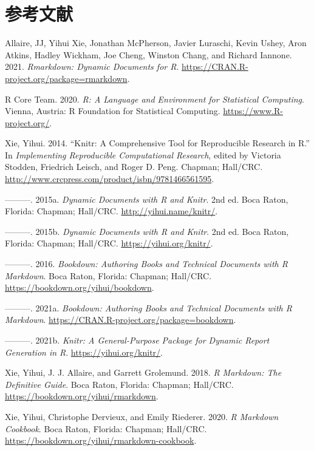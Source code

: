 \documentclass[
  lang=cn,
  11pt,
  scheme=chinese,
  chinesefont=nofont,
  citestyle=gb7714-2015,
  bibstyle=gb7714-2015]{elegantbook}
\newlength{\cslhangindent}
\newenvironment{cslreferences}%
  {\setlength{\parindent}{0pt}%
  \everypar{\setlength{\hangindent}{\cslhangindent}}\ignorespaces}%
  {\par}
\begin{document}
\hypertarget{References}{%
\chapter*{参考文献}\label{References}}

\hypertarget{refs}{}
\begin{cslreferences}
\leavevmode\hypertarget{ref-R-rmarkdown}{}%
Allaire, JJ, Yihui Xie, Jonathan McPherson, Javier Luraschi, Kevin Ushey, Aron Atkins, Hadley Wickham, Joe Cheng, Winston Chang, and Richard Iannone. 2021. \emph{Rmarkdown: Dynamic Documents for R}. \url{https://CRAN.R-project.org/package=rmarkdown}.

\leavevmode\hypertarget{ref-R-base}{}%
R Core Team. 2020. \emph{R: A Language and Environment for Statistical Computing}. Vienna, Austria: R Foundation for Statistical Computing. \url{https://www.R-project.org/}.

\leavevmode\hypertarget{ref-knitr2014}{}%
Xie, Yihui. 2014. ``Knitr: A Comprehensive Tool for Reproducible Research in R.'' In \emph{Implementing Reproducible Computational Research}, edited by Victoria Stodden, Friedrich Leisch, and Roger D. Peng. Chapman; Hall/CRC. \url{http://www.crcpress.com/product/isbn/9781466561595}.

\leavevmode\hypertarget{ref-xie2015}{}%
---------. 2015a. \emph{Dynamic Documents with R and Knitr}. 2nd ed. Boca Raton, Florida: Chapman; Hall/CRC. \url{http://yihui.name/knitr/}.

\leavevmode\hypertarget{ref-knitr2015}{}%
---------. 2015b. \emph{Dynamic Documents with R and Knitr}. 2nd ed. Boca Raton, Florida: Chapman; Hall/CRC. \url{https://yihui.org/knitr/}.

\leavevmode\hypertarget{ref-bookdown2016}{}%
---------. 2016. \emph{Bookdown: Authoring Books and Technical Documents with R Markdown}. Boca Raton, Florida: Chapman; Hall/CRC. \url{https://bookdown.org/yihui/bookdown}.

\leavevmode\hypertarget{ref-R-bookdown}{}%
---------. 2021a. \emph{Bookdown: Authoring Books and Technical Documents with R Markdown}. \url{https://CRAN.R-project.org/package=bookdown}.

\leavevmode\hypertarget{ref-R-knitr}{}%
---------. 2021b. \emph{Knitr: A General-Purpose Package for Dynamic Report Generation in R}. \url{https://yihui.org/knitr/}.

\leavevmode\hypertarget{ref-rmarkdown2018}{}%
Xie, Yihui, J. J. Allaire, and Garrett Grolemund. 2018. \emph{R Markdown: The Definitive Guide}. Boca Raton, Florida: Chapman; Hall/CRC. \url{https://bookdown.org/yihui/rmarkdown}.

\leavevmode\hypertarget{ref-rmarkdown2020}{}%
Xie, Yihui, Christophe Dervieux, and Emily Riederer. 2020. \emph{R Markdown Cookbook}. Boca Raton, Florida: Chapman; Hall/CRC. \url{https://bookdown.org/yihui/rmarkdown-cookbook}.
\end{cslreferences}
\end{document}
